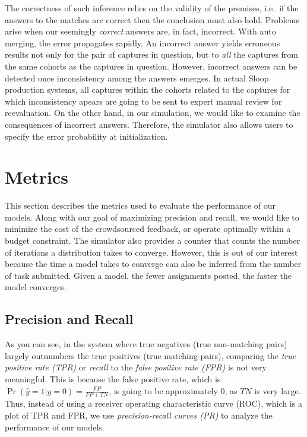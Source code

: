 The correctness of such inference relies on the validity of the premises, i.e.\
if the answers to the matches are correct then the conclusion must also hold.
Problems arise when our seemingly \emph{correct} answers are, in fact,
incorrect. With auto merging, the error propagates rapidly. An incorrect
answer yields erroneous results not only for the pair of captures in question,
but to \emph{all} the captures from the same cohorts as the captures in
question. However, incorrect answers can be detected once inconsistency among
the answers emerges. In actual Sloop production systems, all captures within
the cohorts related to the captures for which inconsistency apears are going to
be sent to expert manual review for reevaluation. On the other hand, in our
simulation, we would like to examine the consequences of incorrect answers.
Therefore, the simulator also allows users to specify the error probability at
initialization.

\section{Metrics} %
\label{sec:metrices}

This section describes the metrics used to evaluate the performance of our models.
Along with our goal of maximizing precision and recall, we would like to
minimize the cost of the crowdsourced feedback, or operate optimally within a
budget constraint. The simulator also provides a counter that counts the number
of iterations a distribution takes to converge. However, this is out of our
interest because the time a model takes to converge can also be inferred from
the number of task submitted. Given a model, the fewer assignments posted, the
faster the model converges. 

\subsection{Precision and Recall} %
\label{sub:precision_and_recall}

As you can see, in the system where true negatives (true non-matching pairs)
largely outnumbers the true positives (true matching-pairs), comparing the
\emph{true positive rate (TPR)} or \emph{recall} to the \emph{false positive rate
(FPR)} is not very meaningful. This is because the false positive rate, which is
$\Pr{(\hat{y}=1|y=0)} = \frac{FP}{FP+TN}$, is going to be approximately 0, as
$TN$ is very large. Thus, instead of using a receiver operating
characteristic curve (ROC), which is a plot of TPR and FPR, we use
\emph{precision-recall curves (PR)} to analyze the performance of our models.

